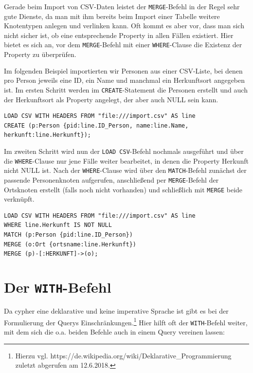 \documentclass[ngerman,]{scrreprt}
\begin{document}
Gerade beim Import von CSV-Daten leistet der \texttt{MERGE}-Befehl in der Regel sehr gute Dienste, da man mit ihm bereits beim Import einer Tabelle weitere Knotentypen anlegen und verlinken kann. Oft kommt es aber vor, dass man sich nicht sicher ist, ob eine entsprechende Property in allen Fällen existiert. Hier bietet es sich an, vor dem \texttt{MERGE}-Befehl mit einer \texttt{WHERE}-Clause die Existenz der Property zu überprüfen.

Im folgenden Beispiel importierten wir Personen aus einer CSV-Liste, bei denen pro Person jeweils eine ID, ein Name und manchmal ein Herkunftsort angegeben ist. Im ersten Schritt werden im \texttt{CREATE}-Statement die Personen erstellt und auch der Herkunftsort als Property angelegt, der aber auch NULL sein kann.

\begin{verbatim}
LOAD CSV WITH HEADERS FROM "file:///import.csv" AS line
CREATE (p:Person {pid:line.ID_Person, name:line.Name, herkunft:line.Herkunft});
\end{verbatim}

Im zweiten Schritt wird nun der \texttt{LOAD\ CSV}-Befehl nochmals ausgeführt und über die \texttt{WHERE}-Clause nur jene Fälle weiter bearbeitet, in denen die Property Herkunft nicht NULL ist. Nach der \texttt{WHERE}-Clause wird über den \texttt{MATCH}-Befehl zunächst der passende Personenknoten aufgerufen, anschließend per \texttt{MERGE}-Befehl der Ortsknoten erstellt (falls noch nicht vorhanden) und schließlich mit \texttt{MERGE} beide verknüpft.

\begin{verbatim}
LOAD CSV WITH HEADERS FROM "file:///import.csv" AS line
WHERE line.Herkunft IS NOT NULL
MATCH (p:Person {pid:line.ID_Person})
MERGE (o:Ort {ortsname:line.Herkunft})
MERGE (p)-[:HERKUNFT]->(o);
\end{verbatim}

\section{\texorpdfstring{Der \texttt{WITH}-Befehl}{Der WITH-Befehl}}\label{der-with-befehl}

Da cypher eine deklarative und keine imperative Sprache ist gibt es bei der Formulierung der Querys Einschränkungen.\footnote{Hierzu vgl. https://de.wikipedia.org/wiki/Deklarative\_Programmierung zuletzt abgerufen am 12.6.2018.} Hier hilft oft der \texttt{WITH}-Befehl weiter, mit dem sich die o.a. beiden Befehle auch in einem Query vereinen lassen:
\end{document}
